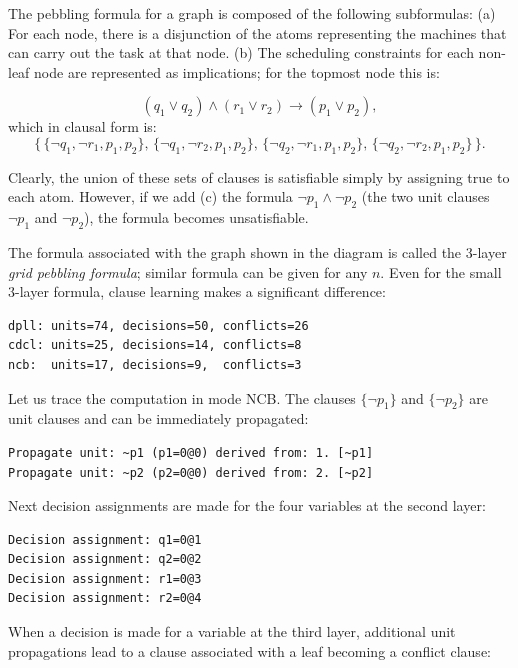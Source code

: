 \documentclass[11pt]{report}
\begin{document}
The pebbling formula for a graph is composed of the following
subformulas: (a) For each node, there is a disjunction of the atoms
representing the machines that can carry out the task at that node. (b)
The scheduling constraints for each non-leaf node are represented as
implications; for the topmost node this is:

\begin{displaymath}
(q_1 \vee q_2) \wedge (r_1 \vee r_2) \rightarrow (p_1 \vee p_2),
\end{displaymath}
which in clausal form is:
\begin{displaymath}
\{\,\{\neg q_1, \neg r_1, p_1, p_2\},\, \{\neg q_1, \neg r_2, p_1,
 p_2\},\, \{\neg q_2, \neg r_1, p_1, p_2\},\, \{\neg q_2, \neg r_2, p_1,
 p_2\}\,\}.
\end{displaymath}

Clearly, the union of these sets of clauses is satisfiable simply by
assigning true to each atom. However, if we add (c) the formula $\neg
p_1 \wedge \neg p_2$ (the two unit clauses $\neg p_1$ and $\neg p_2$),
the formula becomes unsatisfiable.

The formula associated with the graph shown in the diagram is called the
$3$-layer \emph{grid pebbling formula}; similar formula can be given for
any $n$. Even for the small $3$-layer formula, clause learning makes a
significant difference:

\begin{verbatim}
dpll: units=74, decisions=50, conflicts=26
cdcl: units=25, decisions=14, conflicts=8
ncb:  units=17, decisions=9,  conflicts=3
\end{verbatim}

Let us trace the computation in mode NCB. The clauses $\{\neg p_1\}$ and
$\{\neg p_2\}$ are unit clauses and can be immediately propagated:

\begin{verbatim}
Propagate unit: ~p1 (p1=0@0) derived from: 1. [~p1]
Propagate unit: ~p2 (p2=0@0) derived from: 2. [~p2]
\end{verbatim}

Next decision assignments are made for the four variables at the second
layer:

\begin{verbatim}
Decision assignment: q1=0@1
Decision assignment: q2=0@2
Decision assignment: r1=0@3
Decision assignment: r2=0@4
\end{verbatim}

When a decision is made for a variable at the third layer, additional
unit propagations lead to a clause associated with a leaf becoming a
conflict clause:
\end{document}
